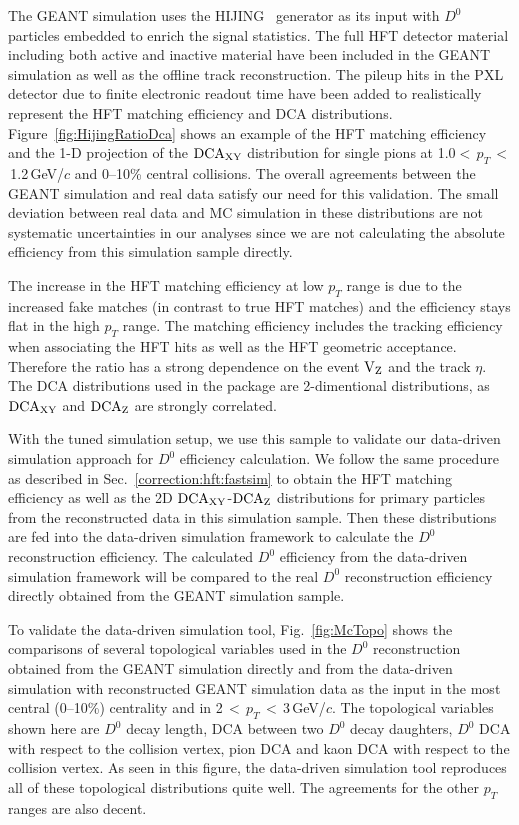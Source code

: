 \documentclass[%
 reprint,	
 amsmath,amssymb,
 aps,
 prc,
]{revtex4-1}
\begin{document}
The GEANT simulation uses the HIJING~\cite{HIJING} generator as its input with $D^0$ particles embedded to enrich the signal statistics. The full HFT detector material including both active and inactive material have been included in the GEANT simulation as well as the offline track reconstruction. The pileup hits in the PXL detector due to finite electronic readout time have been added to realistically represent the HFT matching efficiency and DCA distributions. Figure~\ref{fig:HijingRatioDca} shows an example of the HFT matching efficiency and the 1-D projection of the $\textup{DCA}_{\textup{XY}}$ distribution for single pions at 1.0$<$\,$p_{T}$\,$<$\,1.2\,GeV/$c$ and 0--10\% central collisions. The overall agreements between the GEANT simulation and real data satisfy our need for this validation. The small deviation between real data and MC simulation in these distributions are not systematic uncertainties in our analyses since we are not calculating the absolute efficiency from this simulation sample directly.

The increase in the HFT matching efficiency at low $p_{T}$ range is due to the increased fake matches (in contrast to true HFT matches) and the efficiency stays flat in the high $p_{T}$ range. The matching efficiency includes the tracking efficiency when associating the HFT hits as well as the HFT geometric acceptance. Therefore the ratio has a strong dependence on the event $\textup{V}_\textup{Z}$ and the track $\eta$. The DCA distributions used in the package are 2-dimentional distributions, as $\textup{DCA}_{\textup{XY}}$ and $\textup{DCA}_\textup{Z}$ are strongly correlated.


With the tuned simulation setup, we use this sample to validate our data-driven simulation approach for $D^0$ efficiency calculation. We follow the same procedure as described in Sec.~\ref{correction:hft:fastsim} to obtain the HFT matching efficiency as well as the 2D $\textup{DCA}_\textup{XY}$-$\textup{DCA}_\textup{Z}$ distributions for primary particles from the reconstructed data in this simulation sample. Then these distributions are fed into the data-driven simulation framework to calculate the $D^0$ reconstruction efficiency. The calculated $D^0$ efficiency from the data-driven simulation framework will be compared to the real $D^0$ reconstruction efficiency directly obtained from the GEANT simulation sample.


To validate the data-driven simulation tool, Fig.~\ref{fig:McTopo} shows the comparisons of several topological variables used in the $D^0$ reconstruction obtained from the GEANT simulation directly and from the data-driven simulation with reconstructed GEANT simulation data as the input in the most central (0--10\%) centrality and in 2\,$<$\,$p_{T}$\,$<$\,3\,GeV/$c$. The topological variables shown here are $D^0$ decay length, DCA between two $D^0$ decay daughters, $D^0$ DCA with respect to the collision vertex, pion DCA and kaon DCA with respect to the collision vertex. As seen in this figure, the data-driven simulation tool reproduces all of these topological distributions quite well. The agreements for the other $p_{T}$ ranges are also decent.
\end{document}
